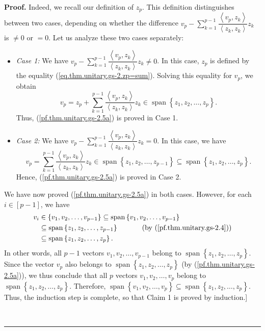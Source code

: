 \documentclass[numbers=enddot,12pt,final,onecolumn,notitlepage]{scrartcl}%
\numberwithin{exer}{subsection}
\theoremstyle{definition}
\newenvironment{proof}[1][Proof]{\noindent\textbf{#1.} }{\ \rule{0.5em}{0.5em}}
\let\sumnonlimits\sum
\renewcommand{\sum}{\sumnonlimits\limits}
\begin{document}
\begin{proof}
Indeed, we recall our definition of $z_{p}$. This definition distinguishes
between two cases, depending on whether the difference $v_{p}-\sum_{k=1}%
^{p-1}\dfrac{\left\langle v_{p},z_{k}\right\rangle }{\left\langle z_{k}%
,z_{k}\right\rangle }z_{k}$ is $\neq0$ or $=0$. Let us analyze these two cases separately:

\begin{itemize}
\item \textit{Case 1:} We have $v_{p}-\sum_{k=1}^{p-1}\dfrac{\left\langle
v_{p},z_{k}\right\rangle }{\left\langle z_{k},z_{k}\right\rangle }z_{k}\neq0$.
In this case, $z_{p}$ is defined by the equality
(\ref{eq.thm.unitary.gs-2.zp=sum}). Solving this equality for $v_{p}$, we
obtain%
\[
v_{p}=z_{p}+\sum_{k=1}^{p-1}\dfrac{\left\langle v_{p},z_{k}\right\rangle
}{\left\langle z_{k},z_{k}\right\rangle }z_{k}\in\operatorname*{span}\left\{
z_{1},z_{2},\ldots,z_{p}\right\}  .
\]
Thus, (\ref{pf.thm.unitary.gs-2.5a}) is proved in Case 1.

\item \textit{Case 2:} We have $v_{p}-\sum_{k=1}^{p-1}\dfrac{\left\langle
v_{p},z_{k}\right\rangle }{\left\langle z_{k},z_{k}\right\rangle }z_{k}=0$. In
this case, we have%
\[
v_{p}=\sum_{k=1}^{p-1}\dfrac{\left\langle v_{p},z_{k}\right\rangle
}{\left\langle z_{k},z_{k}\right\rangle }z_{k}\in\operatorname*{span}\left\{
z_{1},z_{2},\ldots,z_{p-1}\right\}  \subseteq\operatorname*{span}\left\{
z_{1},z_{2},\ldots,z_{p}\right\}  .
\]
Hence, (\ref{pf.thm.unitary.gs-2.5a}) is proved in Case 2.
\end{itemize}

We have now proved (\ref{pf.thm.unitary.gs-2.5a}) in both cases. However, for
each $i\in\left[  p-1\right]  $, we have%
\begin{align*}
v_{i}  &  \in\left\{  v_{1},v_{2},\ldots,v_{p-1}\right\}  \subseteq
\operatorname*{span}\left\{  v_{1},v_{2},\ldots,v_{p-1}\right\} \\
&  \subseteq\operatorname*{span}\left\{  z_{1},z_{2},\ldots,z_{p-1}\right\}
\ \ \ \ \ \ \ \ \ \ \left(  \text{by (\ref{pf.thm.unitary.gs-2.4})}\right) \\
&  \subseteq\operatorname*{span}\left\{  z_{1},z_{2},\ldots,z_{p}\right\}  .
\end{align*}
In other words, all $p-1$ vectors $v_{1},v_{2},\ldots,v_{p-1}$ belong to
$\operatorname*{span}\left\{  z_{1},z_{2},\ldots,z_{p}\right\}  $. Since the
vector $v_{p}$ also belongs to $\operatorname*{span}\left\{  z_{1}%
,z_{2},\ldots,z_{p}\right\}  $ (by (\ref{pf.thm.unitary.gs-2.5a})), we thus
conclude that all $p$ vectors $v_{1},v_{2},\ldots,v_{p}$ belong to
$\operatorname*{span}\left\{  z_{1},z_{2},\ldots,z_{p}\right\}  $. Therefore,
$\operatorname*{span}\left\{  v_{1},v_{2},\ldots,v_{p}\right\}  \subseteq
\operatorname*{span}\left\{  z_{1},z_{2},\ldots,z_{p}\right\}  $. Thus, the
induction step is complete, so that Claim 1 is proved by induction.]


\end{proof}
\end{document}
